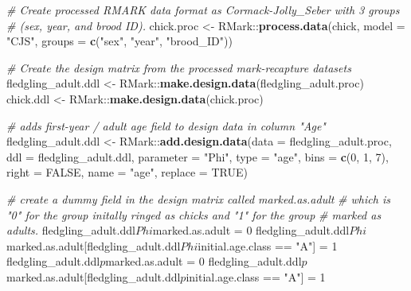 \documentclass[]{article}
\newenvironment{Shaded}{\begin{snugshade}}{\end{snugshade}}
\newcommand{\KeywordTok}[1]{\textcolor[rgb]{0.13,0.29,0.53}{\textbf{{#1}}}}
\newcommand{\DataTypeTok}[1]{\textcolor[rgb]{0.13,0.29,0.53}{{#1}}}
\newcommand{\DecValTok}[1]{\textcolor[rgb]{0.00,0.00,0.81}{{#1}}}
\newcommand{\StringTok}[1]{\textcolor[rgb]{0.31,0.60,0.02}{{#1}}}
\newcommand{\CommentTok}[1]{\textcolor[rgb]{0.56,0.35,0.01}{\textit{{#1}}}}
\newcommand{\OtherTok}[1]{\textcolor[rgb]{0.56,0.35,0.01}{{#1}}}
\newcommand{\NormalTok}[1]{{#1}}
\begin{document}
\begin{Shaded}
\begin{Highlighting}[]
  \CommentTok{# Create processed RMARK data format as Cormack-Jolly_Seber with 3 groups }
  \CommentTok{# (sex, year, and brood ID).}
  \NormalTok{chick.proc <-}\StringTok{  }\NormalTok{RMark::}\KeywordTok{process.data}\NormalTok{(chick, }\DataTypeTok{model =} \StringTok{"CJS"}\NormalTok{,}
                                     \DataTypeTok{groups =} \KeywordTok{c}\NormalTok{(}\StringTok{"sex"}\NormalTok{, }\StringTok{"year"}\NormalTok{, }\StringTok{"brood_ID"}\NormalTok{))}
  
  \CommentTok{# Create the design matrix from the processed mark-recapture datasets}
  \NormalTok{fledgling_adult.ddl <-}\StringTok{ }\NormalTok{RMark::}\KeywordTok{make.design.data}\NormalTok{(fledgling_adult.proc)}
  \NormalTok{chick.ddl <-}\StringTok{ }\NormalTok{RMark::}\KeywordTok{make.design.data}\NormalTok{(chick.proc)}
  
  \CommentTok{# adds first-year / adult age field to design data in column "Age"}
  \NormalTok{fledgling_adult.ddl <-}\StringTok{ }\NormalTok{RMark::}\KeywordTok{add.design.data}\NormalTok{(}\DataTypeTok{data =} \NormalTok{fledgling_adult.proc,}
                                                \DataTypeTok{ddl =} \NormalTok{fledgling_adult.ddl, }
                                                \DataTypeTok{parameter =} \StringTok{"Phi"}\NormalTok{, }
                                                \DataTypeTok{type =} \StringTok{"age"}\NormalTok{,}
                                                \DataTypeTok{bins =} \KeywordTok{c}\NormalTok{(}\DecValTok{0}\NormalTok{, }\DecValTok{1}\NormalTok{, }\DecValTok{7}\NormalTok{), }\DataTypeTok{right =} \OtherTok{FALSE}\NormalTok{,}
                                                \DataTypeTok{name =} \StringTok{"age"}\NormalTok{, }\DataTypeTok{replace =} \OtherTok{TRUE}\NormalTok{)}
  
  \CommentTok{# create a dummy field in the design matrix called marked.as.adult }
  \CommentTok{# which is "0" for the group initally ringed as chicks and "1" for the group}
  \CommentTok{# marked as adults.}
  \NormalTok{fledgling_adult.ddl$Phi$marked.as.adult =}\StringTok{ }\DecValTok{0}
  \NormalTok{fledgling_adult.ddl$Phi$marked.as.adult[fledgling_adult.ddl$Phi$initial.age.class ==}\StringTok{ "A"}\NormalTok{] =}\StringTok{ }\DecValTok{1} 
  \NormalTok{fledgling_adult.ddl$p$marked.as.adult =}\StringTok{ }\DecValTok{0}
  \NormalTok{fledgling_adult.ddl$p$marked.as.adult[fledgling_adult.ddl$p$initial.age.class ==}\StringTok{ "A"}\NormalTok{] =}\StringTok{ }\DecValTok{1}
  

\end{Highlighting}
\end{Shaded}
\end{document}
